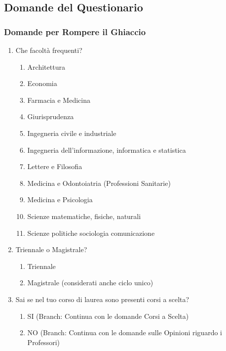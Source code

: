 \subsection{Domande del Questionario}

\subsubsection{Domande per Rompere il Ghiaccio}
\begin{enumerate}
    \item Che facoltà frequenti?
    \begin{enumerate}
        \item Architettura
        \item Economia
        \item Farmacia e Medicina
        \item Giurisprudenza
        \item Ingegneria civile e industriale
        \item Ingegneria dell'informazione, informatica e statistica
        \item Lettere e Filosofia
        \item Medicina e Odontoiatria (Professioni Sanitarie)
        \item Medicina e Psicologia
        \item Scienze matematiche, fisiche, naturali
        \item Scienze politiche sociologia comunicazione
    \end{enumerate}
    \item Triennale o Magistrale?
    \begin{enumerate}
        \item Triennale
        \item Magistrale (considerati anche ciclo unico)
    \end{enumerate}
    \item Sai se nel tuo corso di laurea sono presenti corsi a scelta?
    \begin{enumerate}
        \item SI (Branch: Continua con le domande Corsi a Scelta)
        \item NO (Branch: Continua con le domande sulle Opinioni riguardo i Professori)
    \end{enumerate}
\end{enumerate}


